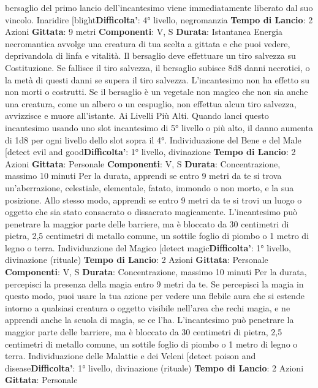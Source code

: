 \begin{multicols}{2}
bersaglio del primo lancio dell’incantesimo viene
immediatamente liberato dal suo vincolo.
Inaridire
[blight\textbf{Difficolta'}:
4° livello, negromanzia
\textbf{Tempo di Lancio}: 2 Azioni
\textbf{Gittata}: 9 metri
\textbf{Componenti}: V, S
\textbf{Durata}: Istantanea
Energia necromantica avvolge una creatura di tua
scelta a gittata e che puoi vedere, deprivandola di linfa
e vitalità. Il bersaglio deve effettuare un tiro salvezza su
Costituzione. Se fallisce il tiro salvezza, il bersaglio
subisce 8d8 danni necrotici, o la metà di questi danni se
supera il tiro salvezza. L’incantesimo non ha effetto su
non morti o costrutti.
Se il bersaglio è un vegetale non magico che non sia
anche una creatura, come un albero o un cespuglio,
non effettua alcun tiro salvezza, avvizzisce e muore
all’istante.
Ai Livelli Più Alti. Quando lanci questo incantesimo
usando uno slot incantesimo di 5° livello o più alto, il
danno aumenta di 1d8 per ogni livello dello slot sopra il
4°.
Individuazione del Bene e del Male
[detect evil and good\textbf{Difficolta'}:
1° livello, divinazione
\textbf{Tempo di Lancio}: 2 Azioni
\textbf{Gittata}: Personale
\textbf{Componenti}: V, S
\textbf{Durata}: Concentrazione, massimo 10 minuti
Per la durata, apprendi se entro 9 metri da te si trova
un’aberrazione, celestiale, elementale, fatato, immondo
o non morto, e la sua posizione. Allo stesso modo,
apprendi se entro 9 metri da te si trovi un luogo o
oggetto che sia stato consacrato o dissacrato
magicamente.
L’incantesimo può penetrare la maggior parte delle
barriere, ma è bloccato da 30 centimetri di pietra, 2,5
centimetri di metallo comune, un sottile foglio di piombo
o 1 metro di legno o terra.
Individuazione del Magico
[detect magic\textbf{Difficolta'}:
1° livello, divinazione (rituale)
\textbf{Tempo di Lancio}: 2 Azioni
\textbf{Gittata}: Personale
\textbf{Componenti}: V, S
\textbf{Durata}: Concentrazione, massimo 10 minuti
Per la durata, percepisci la presenza della magia entro
9 metri da te. Se percepisci la magia in questo modo,
puoi usare la tua azione per vedere una flebile aura che 
si estende intorno a qualsiasi creatura o oggetto visibile
nell’area che rechi magia, e ne apprendi anche la
scuola di magia, se ce l’ha.
L’incantesimo può penetrare la maggior parte delle
barriere, ma è bloccato da 30 centimetri di pietra, 2,5
centimetri di metallo comune, un sottile foglio di piombo
o 1 metro di legno o terra.
Individuazione delle Malattie e dei Veleni
[detect poison and disease\textbf{Difficolta'}:
1° livello, divinazione (rituale)
\textbf{Tempo di Lancio}: 2 Azioni
\textbf{Gittata}: Personale

\end{multicols}
